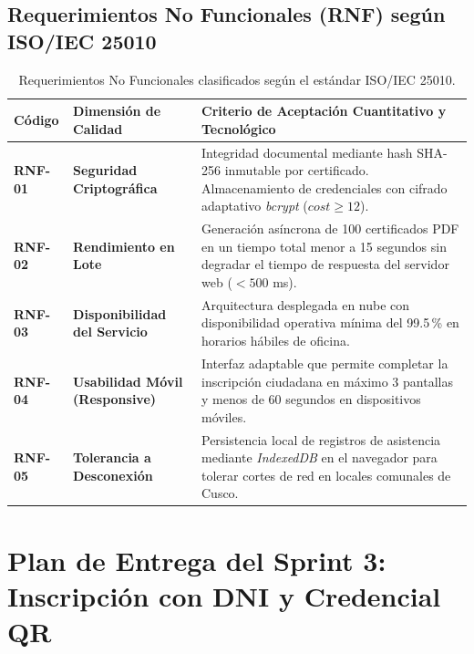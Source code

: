 \documentclass[11pt,a4paper]{article}
\begin{document}
\subsection{Requerimientos No Funcionales (RNF) según ISO/IEC 25010}

\begin{table}[H]
\centering
\small
\renewcommand{\arraystretch}{1.2}
\begin{tabularx}{\textwidth}{P{1.5cm}P{3.4cm}Y}
\toprule
\textbf{Código} & \textbf{Dimensión de Calidad} & \textbf{Criterio de Aceptación Cuantitativo y Tecnológico} \\
\midrule
\textbf{RNF-01} & \textbf{Seguridad Criptográfica} & Integridad documental mediante hash SHA-256 inmutable por certificado. Almacenamiento de credenciales con cifrado adaptativo \textit{bcrypt} ($cost \ge 12$). \\
\midrule
\textbf{RNF-02} & \textbf{Rendimiento en Lote} & Generación asíncrona de 100 certificados PDF en un tiempo total menor a 15 segundos sin degradar el tiempo de respuesta del servidor web ($< 500$ ms). \\
\midrule
\textbf{RNF-03} & \textbf{Disponibilidad del Servicio} & Arquitectura desplegada en nube con disponibilidad operativa mínima del 99.5\,\% en horarios hábiles de oficina. \\
\midrule
\textbf{RNF-04} & \textbf{Usabilidad Móvil (Responsive)} & Interfaz adaptable que permite completar la inscripción ciudadana en máximo 3 pantallas y menos de 60 segundos en dispositivos móviles. \\
\midrule
\textbf{RNF-05} & \textbf{Tolerancia a Desconexión} & Persistencia local de registros de asistencia mediante \textit{IndexedDB} en el navegador para tolerar cortes de red en locales comunales de Cusco. \\
\bottomrule
\end{tabularx}
\caption{Requerimientos No Funcionales clasificados según el estándar ISO/IEC 25010.}
\label{tab:rnf}
\end{table}


\section{Plan de Entrega del Sprint 3: Inscripción con DNI y Credencial QR}
\end{document}
